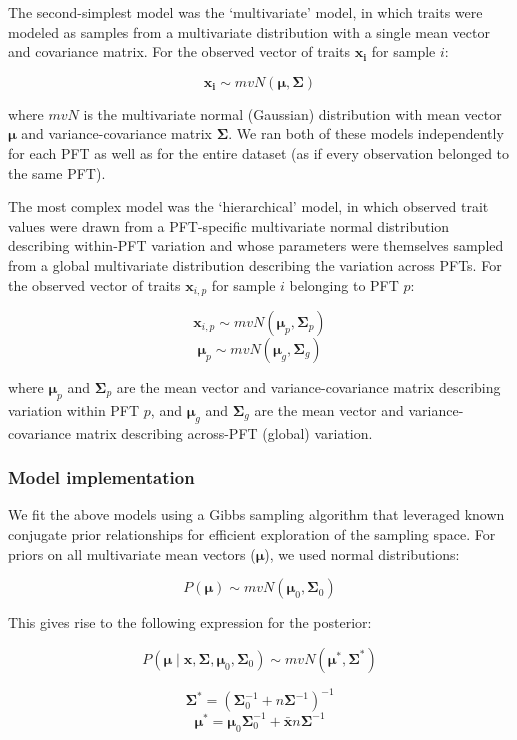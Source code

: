 The second-simplest model was the ‘multivariate’ model, in which traits were modeled as samples from a multivariate distribution with a single mean vector and covariance matrix.
For the observed vector of traits ${\mathbf{x_i}}$ for sample $i$:

\[\mathbf{x_i} \sim mvN(\mathbf{\mu}, \mathbf{\Sigma})\]

where $mvN$ is the multivariate normal (Gaussian) distribution with mean vector $\mathbf{\mu}$ and variance-covariance matrix $\mathbf{\Sigma}$.
We ran both of these models independently for each PFT as well as for the entire dataset (as if every observation belonged to the same PFT).

The most complex model was the ‘hierarchical’ model, in which observed trait values were drawn from a PFT-specific multivariate normal distribution describing within-PFT variation and whose parameters were themselves sampled from a global multivariate distribution describing the variation across PFTs.
For the observed vector of traits $\mathbf{x}_{i,p}$ for sample $i$ belonging to PFT $p$:

\[\mathbf{x}_{i,p} \sim mvN(\mathbf{\mu}_p, \mathbf{\Sigma}_p)\]
\[\mathbf{\mu}_p \sim mvN(\mathbf{\mu}_g, \mathbf{\Sigma}_g)\]

where $\mathbf{\mu}_p$ and $\mathbf{\Sigma}_p$ are the mean vector and variance-covariance matrix describing variation within PFT $p$, and $\mathbf{\mu}_g$ and $\mathbf{\Sigma}_g$ are the mean vector and variance-covariance matrix describing across-PFT (global) variation.


\subsubsection{Model implementation}

We fit the above models using a Gibbs sampling algorithm that leveraged known conjugate prior relationships for efficient exploration of the sampling space.
For priors on all multivariate mean vectors ($\mathbf{\mu}$), we used normal distributions:

\[P(\mathbf{\mu}) \sim mvN(\mathbf{\mu}_0, {\mathbf{\Sigma}}_0)\]

This gives rise to the following expression for the posterior:

\[P(\mathbf{\mu} \mid 
    \mathbf{x}, \mathbf{\Sigma}, 
    \mathbf{\mu}_0, \mathbf{\Sigma}_0)
  \sim
  mvN(\mathbf{\mu^*}, \mathbf{\Sigma^*})\]

\[\mathbf{\Sigma^*} = {(\mathbf{\Sigma}_0^{-1} + n \mathbf{\Sigma}^{-1})}^{-1}\]
\[\mathbf{\mu^*} = \mathbf{\mu}_0 \mathbf{\Sigma}_0^{-1} + \bar{\mathbf{x}} n \mathbf{\Sigma}^{-1}\]

